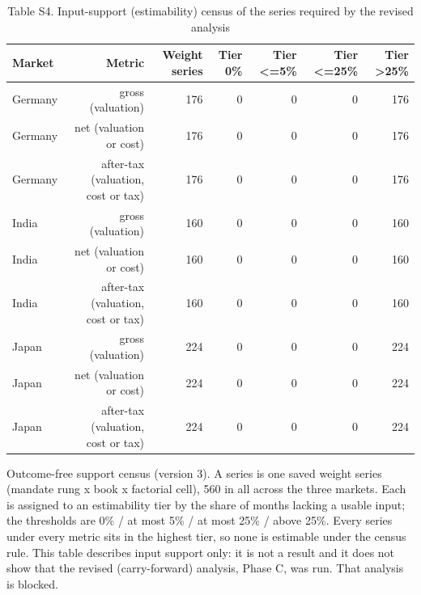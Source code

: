 \begin{table}[t]
\centering
\small
\caption{Table S4. Input-support (estimability) census of the series required by the revised analysis}
\label{tab:s4}
\begin{tabular}{lrrrrrr}
\toprule
Market & Metric & Weight series & Tier 0\% & Tier <=5\% & Tier <=25\% & Tier >25\% \\
\midrule
Germany & gross (valuation) & 176 & 0 & 0 & 0 & 176 \\
Germany & net (valuation or cost) & 176 & 0 & 0 & 0 & 176 \\
Germany & after-tax (valuation, cost or tax) & 176 & 0 & 0 & 0 & 176 \\
India & gross (valuation) & 160 & 0 & 0 & 0 & 160 \\
India & net (valuation or cost) & 160 & 0 & 0 & 0 & 160 \\
India & after-tax (valuation, cost or tax) & 160 & 0 & 0 & 0 & 160 \\
Japan & gross (valuation) & 224 & 0 & 0 & 0 & 224 \\
Japan & net (valuation or cost) & 224 & 0 & 0 & 0 & 224 \\
Japan & after-tax (valuation, cost or tax) & 224 & 0 & 0 & 0 & 224 \\
\bottomrule
\end{tabular}
\par\vspace{2pt}
\parbox{\textwidth}{\footnotesize Outcome-free support census (version 3). A series is one saved weight series (mandate rung x book x factorial cell), 560 in all across the three markets. Each is assigned to an estimability tier by the share of months lacking a usable input; the thresholds are 0\% / at most 5\% / at most 25\% / above 25\%. Every series under every metric sits in the highest tier, so none is estimable under the census rule. This table describes input support only: it is not a result and it does not show that the revised (carry-forward) analysis, Phase C, was run. That analysis is blocked.}
\end{table}
